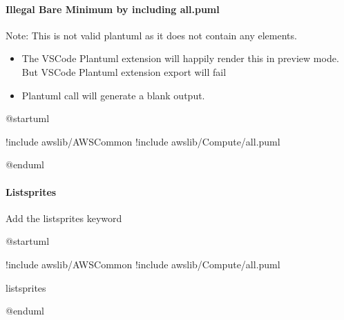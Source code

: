 \documentclass[letterpaper,10pt,english]{sphinxmanual}
\begin{document}
\paragraph{Illegal Bare Minimum by including all.puml}
\label{\detokenize{StdlibUnderTheHood/StdlibUnderstanding:illegal-bare-minimum-by-including-all-puml}}
Note: This is not valid plantuml as it does not contain any elements.
\begin{itemize}
\item {} 
The VSCode Plantuml extension will happily render this in preview mode. But VSCode Plantuml extension export will fail

\item {} 
Plantuml call will generate a blank output.

\end{itemize}

%
\begin{sphinxVerbatim}[commandchars=\\\{\},numbers=left,firstnumber=1,stepnumber=1]
@startuml 

!include \PYGZlt{}awslib/AWSCommon\PYGZgt{}
!include \PYGZlt{}awslib/Compute/all.puml\PYGZgt{}

@enduml
\end{sphinxVerbatim}
\sphinxresetverbatimhllines


\paragraph{Listsprites}
\label{\detokenize{StdlibUnderTheHood/StdlibUnderstanding:listsprites}}
Add the listsprites keyword

\begin{figure}[htbp]
\centering

\end{figure}

%
\begin{sphinxVerbatim}[commandchars=\\\{\},numbers=left,firstnumber=1,stepnumber=1]
@startuml 

!include \PYGZlt{}awslib/AWSCommon\PYGZgt{}
!include \PYGZlt{}awslib/Compute/all.puml\PYGZgt{}

listsprites

@enduml
\end{sphinxVerbatim}
\sphinxresetverbatimhllines
\end{document}
